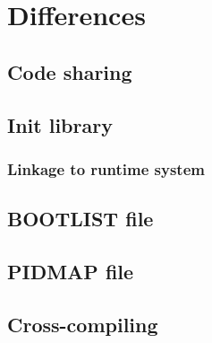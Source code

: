 
\section{Differences}

\subsection{Code sharing}

\subsection{Init library}

\subsubsection{Linkage to runtime system}

\subsection{BOOTLIST file}

\subsection{PIDMAP file}

\subsection{Cross-compiling}

